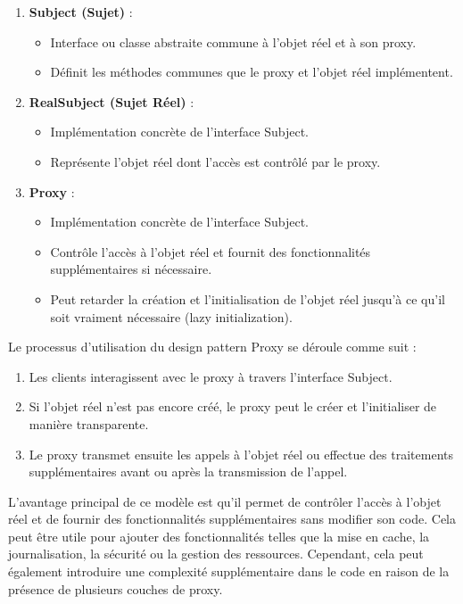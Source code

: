 \begin{enumerate}[leftmargin=*,labelsep=3mm]
    \item \textbf{Subject (Sujet)} :
    \begin{itemize}
        \item Interface ou classe abstraite commune à l'objet réel et à son proxy.
        \item Définit les méthodes communes que le proxy et l'objet réel implémentent.
    \end{itemize}
    
    \item \textbf{RealSubject (Sujet Réel)} :
    \begin{itemize}
        \item Implémentation concrète de l'interface Subject.
        \item Représente l'objet réel dont l'accès est contrôlé par le proxy.
    \end{itemize}
    
    \item \textbf{Proxy} :
    \begin{itemize}
        \item Implémentation concrète de l'interface Subject.
        \item Contrôle l'accès à l'objet réel et fournit des fonctionnalités supplémentaires si nécessaire.
        \item Peut retarder la création et l'initialisation de l'objet réel jusqu'à ce qu'il soit vraiment nécessaire (lazy initialization).
    \end{itemize}
\end{enumerate}

Le processus d'utilisation du design pattern Proxy se déroule comme suit :

\begin{enumerate}[leftmargin=*,labelsep=3mm]
    \item Les clients interagissent avec le proxy à travers l'interface Subject.
    \item Si l'objet réel n'est pas encore créé, le proxy peut le créer et l'initialiser de manière transparente.
    \item Le proxy transmet ensuite les appels à l'objet réel ou effectue des traitements supplémentaires avant ou après la transmission de l'appel.
\end{enumerate}

L'avantage principal de ce modèle est qu'il permet de contrôler l'accès à l'objet réel et de fournir des fonctionnalités supplémentaires sans modifier son code. Cela peut être utile pour ajouter des fonctionnalités telles que la mise en cache, la journalisation, la sécurité ou la gestion des ressources. Cependant, cela peut également introduire une complexité supplémentaire dans le code en raison de la présence de plusieurs couches de proxy.


